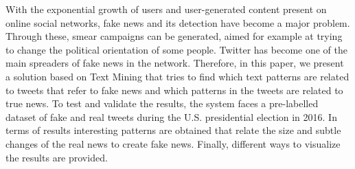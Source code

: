 
	
With the exponential growth of users and user-generated content present on online social networks, fake  news and its detection have become a major problem. Through these, smear campaigns can be generated, aimed for example at trying to change the political orientation of some people. Twitter has become one of the main spreaders of fake news in the network. Therefore, in this paper, we present a solution based on Text Mining that tries to find which text patterns are related to tweets that refer to fake news and which patterns in the tweets are related to true news. To test and validate the results, the system faces a pre-labelled dataset of fake and real tweets during the U.S. presidential election in 2016. In terms of results interesting patterns are obtained that relate the size and subtle changes of the real news to create fake news. Finally, different ways to visualize the results are provided. 	


